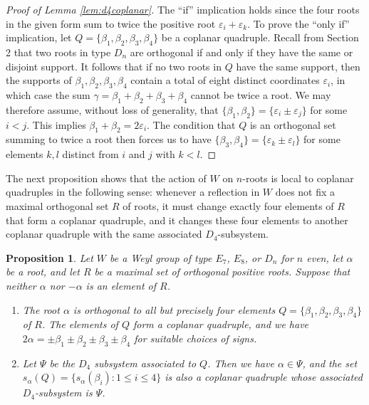 \documentclass[11pt]{amsart}
\theoremstyle{plain}
\newtheorem{prop}[theorem]{Proposition}
\theoremstyle{definition}
\theoremstyle{remark}
\numberwithin{equation}{subsection}
\newcommand{\al}{\alpha}
\newcommand{\be}{\beta}
\newcommand{\ep}{\varepsilon}
\newcommand{\coplanar}{coplanar\xspace}
\begin{document}
\begin{proof}[Proof of Lemma \ref{lem:d4coplanar}]
The ``if'' implication holds since the four roots in the given form sum to twice
the positive root $\ep_i+\ep_k$. To prove the ``only if'' implication, let
$Q=\{\be_1,\be_2,\be_3,\be_4\}$ be a coplanar quadruple. Recall from Section 2
that two roots in type $D_n$ are orthogonal if and only if they have the same or
disjoint support. It follows that if no two roots in $Q$ have the same support,
then the supports of $\be_1,\be_2,\be_3,\be_4$ contain a total of eight distinct
coordinates $\ep_i$, in which case the sum $\gamma=\be_1+\be_2+\be_3+\be_4$
cannot be twice a root. We may therefore assume, without loss of generality,
that $\{\be_1,\be_2\}=\{\ep_i\pm\ep_j\}$ for some $i<j$. This implies
$\beta_1+\beta_2=2\ep_i$. The condition that $Q$ is an orthogonal set summing to
twice a root then forces us to have $\{\be_3,\be_4\}=\{\ep_k\pm\ep_l\}$ for some
elements $k,l$ distinct from $i$ and $j$ with $k<l$.
\end{proof}

The next proposition shows that the action of $W$ on $n$-roots is local to
coplanar quadruples in the following sense: whenever a reflection in $W$ does
not fix a maximal orthogonal set $R$ of roots, it must change exactly four
elements of $R$ that form a \coplanar quadruple, and it changes these four
elements to another coplanar quadruple with the same associated $D_4$-subsystem.

\begin{prop}\label{prop:four}
Let $W$ be a Weyl group of type $E_7$, $E_8$, or $D_n$ for $n$ even, let $\al$
be a root, and let $R$ be a maximal set of orthogonal positive roots. Suppose
that neither $\al$ nor $-\al$ is an element of $R$.
\begin{enumerate}
    \item[{\rm (i)}] The root $\al$ is orthogonal to all but precisely four
     elements $Q = \{\be_1, \be_2, \be_3, \be_4\}$ of $R$.  The elements of $Q$
     form a \coplanar quadruple, and we have $ 2\al = \pm \be_1 \pm \be_2 \pm
     \be_3 \pm \be_4$ for suitable choices of signs.
 \item[{\rm (ii)}] Let $\Psi$ be the $D_4$ subsystem associated to $Q$. Then we
     have $\alpha\in \Psi$, and the set $s_\al(Q)=\{s_\al(\be_i):1\le i\le 4\}$
     is also a \coplanar quadruple whose associated $D_4$-subsystem is $\Psi$.
\end{enumerate}
\end{prop}
\end{document}
